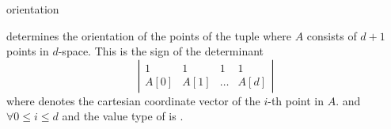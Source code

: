 \begin{ccRefFunction}{orientation}
\ccHtmlNoLinks

{determines the orientation of the points of the tuple
 \ccc{A = tuple [first,last)} where $A$ consists of $d + 1$ points in 
 $d$-space. This is the sign of the determinant
  \[ \left| \begin{array}{cccc}
  1 & 1 & 1 & 1 \\
  A[0] & A[1] & \dots & A[d]
  \end{array}  \right|  \]
  where  denotes the cartesian coordinate vector of 
  the $i$-th point in $A$.
  \ccPrecond \ccc{size [first,last) == d+1} and 
   $\forall 0 \leq i \leq d$
  and the value type of  is .
}

\end{ccRefFunction}

